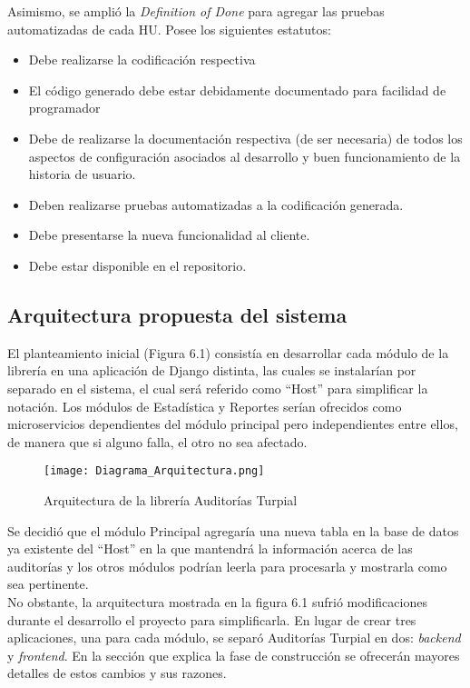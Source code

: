 Asimismo, se amplió la \textit{Definition of Done} para agregar las pruebas automatizadas de cada HU. Posee los siguientes estatutos:

\begin{itemize}
    \item Debe realizarse la codificación respectiva
    \item El código generado debe estar debidamente documentado para facilidad de programador
    \item Debe de realizarse la documentación respectiva (de ser necesaria) de todos los aspectos de configuración asociados al desarrollo y buen funcionamiento de la historia de usuario.
    \item Deben realizarse pruebas automatizadas a la codificación generada.
    \item Debe presentarse la nueva funcionalidad al cliente.
    \item Debe estar disponible en el repositorio.
\end{itemize}

\subsection{Arquitectura propuesta del sistema}

El planteamiento inicial (Figura 6.1) consistía en desarrollar cada módulo de la librería en una aplicación de Django distinta, las cuales se instalarían por separado en el sistema, el cual será referido como “Host” para simplificar la notación. Los módulos de Estadística y Reportes serían ofrecidos como microservicios dependientes del módulo principal pero independientes entre ellos, de manera que si alguno falla, el otro no sea afectado.\\

\begin{figure}
\centering
\texttt{[image: Diagrama\_Arquitectura.png]}
\caption{Arquitectura de la librería Auditorías Turpial}
\label{fig:figure6.1}
\end{figure}

Se decidió que el módulo Principal agregaría una nueva tabla en la base de datos ya existente del “Host” en la que mantendrá la información acerca de las auditorías y los otros módulos podrían leerla para procesarla y mostrarla como sea  pertinente.\\

No obstante, la arquitectura mostrada en la figura 6.1 sufrió modificaciones durante el desarrollo  el proyecto para simplificarla. En lugar de crear tres aplicaciones, una para cada módulo, se separó Auditorías Turpial en dos: \textit{backend} y \textit{frontend}. En la sección que explica la fase de construcción se ofrecerán mayores detalles de estos cambios y sus razones.

